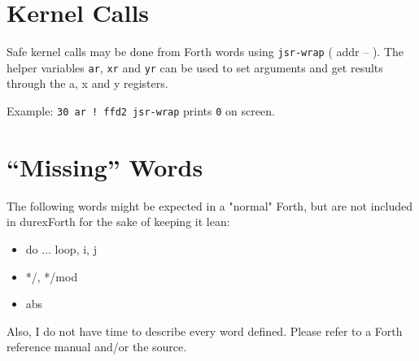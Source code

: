\section{Kernel Calls}

Safe kernel calls may be done from Forth words using \texttt{jsr-wrap} ( addr -- ). The helper variables \texttt{ar}, \texttt{xr} and \texttt{yr} can be used to set arguments and get results through the a, x and y registers.

Example: \texttt{30 ar ! ffd2 jsr-wrap} prints \texttt{0} on screen.

\section{``Missing'' Words}

The following words might be expected in a "normal" Forth, but are not included in durexForth for the sake of keeping it lean:

\begin{itemize}
\item do ... loop, i, j
\item */, */mod
\item abs
\end{itemize}

Also, I do not have time to describe every word defined. Please refer to a Forth reference manual and/or the source.
